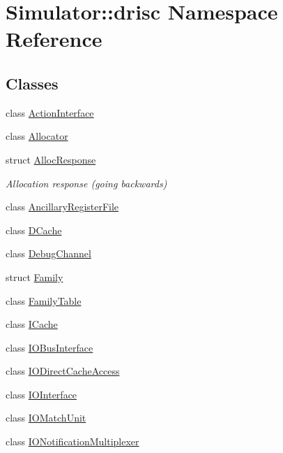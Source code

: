 \hypertarget{namespace_simulator_1_1drisc}{\section{Simulator\+:\+:drisc Namespace Reference}
\label{namespace_simulator_1_1drisc}
}
\subsection*{Classes}
\begin{DoxyCompactItemize}
\item 
class \hyperlink{class_simulator_1_1drisc_1_1_action_interface}{Action\+Interface}
\item 
class \hyperlink{class_simulator_1_1drisc_1_1_allocator}{Allocator}
\item 
struct \hyperlink{struct_simulator_1_1drisc_1_1_alloc_response}{Alloc\+Response}
\begin{DoxyCompactList}\small\item\em Allocation response (going backwards) \end{DoxyCompactList}\item 
class \hyperlink{class_simulator_1_1drisc_1_1_ancillary_register_file}{Ancillary\+Register\+File}
\item 
class \hyperlink{class_simulator_1_1drisc_1_1_d_cache}{D\+Cache}
\item 
class \hyperlink{class_simulator_1_1drisc_1_1_debug_channel}{Debug\+Channel}
\item 
struct \hyperlink{struct_simulator_1_1drisc_1_1_family}{Family}
\item 
class \hyperlink{class_simulator_1_1drisc_1_1_family_table}{Family\+Table}
\item 
class \hyperlink{class_simulator_1_1drisc_1_1_i_cache}{I\+Cache}
\item 
class \hyperlink{class_simulator_1_1drisc_1_1_i_o_bus_interface}{I\+O\+Bus\+Interface}
\item 
class \hyperlink{class_simulator_1_1drisc_1_1_i_o_direct_cache_access}{I\+O\+Direct\+Cache\+Access}
\item 
class \hyperlink{class_simulator_1_1drisc_1_1_i_o_interface}{I\+O\+Interface}
\item 
class \hyperlink{class_simulator_1_1drisc_1_1_i_o_match_unit}{I\+O\+Match\+Unit}
\item 
class \hyperlink{class_simulator_1_1drisc_1_1_i_o_notification_multiplexer}{I\+O\+Notification\+Multiplexer}
\item 

\end{DoxyCompactItemize}
